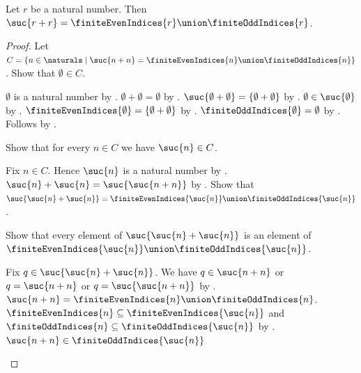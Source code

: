 \begin{theorem}\label{finite_double_index_partition}
    Let $r$ be a natural number.
    Then $\suc{r+r}=\finiteEvenIndices{r}\union\finiteOddIndices{r}$.
\end{theorem}
\begin{proof}
    Let $C=\{n\in\naturals\mid
        \suc{n+n}=\finiteEvenIndices{n}\union\finiteOddIndices{n}\}$.
    Show that $\emptyset\in C$.
    \begin{subproof}
        $\emptyset$ is a natural number by .
        $\emptyset+\emptyset=\emptyset$
            by .
        $\suc{\emptyset+\emptyset}=\{\emptyset+\emptyset\}$
            by .
        $\emptyset\in\suc{\emptyset}$ by .
        $\finiteEvenIndices{\emptyset}
            =\{\emptyset+\emptyset\}$
            by .
        $\finiteOddIndices{\emptyset}=\emptyset$
            by .
        Follows by .
    \end{subproof}
    Show that for every $n\in C$ we have $\suc{n}\in C$.
    \begin{subproof}
        Fix $n\in C$.
        Hence $\suc{n}$ is a natural number by .
        $\suc{n}+\suc{n}=\suc{\suc{n+n}}$
            by .
        Show that
            $\suc{\suc{n}+\suc{n}}
                =\finiteEvenIndices{\suc{n}}
                    \union\finiteOddIndices{\suc{n}}$.
        \begin{subproof}
            Show that every element of
                $\suc{\suc{n}+\suc{n}}$ is an element of
                $\finiteEvenIndices{\suc{n}}
                    \union\finiteOddIndices{\suc{n}}$.
            \begin{subproof}
                Fix $q\in\suc{\suc{n}+\suc{n}}$.
                We have $q\in\suc{n+n}$ or $q=\suc{n+n}$ or
                    $q=\suc{\suc{n+n}}$
                    by .
                $\suc{n+n}
                    =\finiteEvenIndices{n}\union\finiteOddIndices{n}$.
                $\finiteEvenIndices{n}\subseteq
                    \finiteEvenIndices{\suc{n}}$ and
                    $\finiteOddIndices{n}\subseteq
                    \finiteOddIndices{\suc{n}}$
                    by .
                $\suc{n+n}\in\finiteOddIndices{\suc{n}}$

\end{subproof}
\end{subproof}
\end{subproof}
\end{proof}

